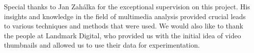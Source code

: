 \documentclass{../resources/sig-alternate-05-2015}
\begin{document}
Special thanks to Jan Zahálka for the exceptional supervision on this project. His insights and knowledge in the field of multimedia analysis provided crucial leads to various techniques and methods that were used. We would also like to thank the people at Landmark Digital, who provided us with the initial idea of video thumbnails and allowed us to use their data for experimentation.
%
%
%
%

\printbibliography

\balancecolumns
\end{document}
